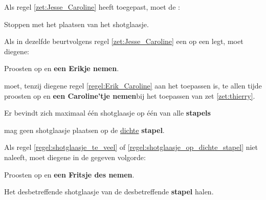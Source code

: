 \vervolgLijst{}
\item \label{zet:Jesse_Caroline_2} Als \eenSpeler regel \ref{zet:Jesse_Caroline} heeft toegepast, moet de \huidigeSpelerN:
\puntLijst{}
\item Stoppen met het plaatsen van het shotglaasje.
\eindPuntLijst{}
\eindLijst{}

\vervolgLijst{}
\item \label{regel:Erik_Caroline} Als \eenSpeler in dezelfde beurt\footnotemark[7] volgens regel \ref{zet:Jesse_Caroline} een \footnotemark[5] op een \footnotemark[6] legt, moet diegene:
\puntLijst{}
\item Proosten op  en \textbf{een Erikje nemen}\footnotemark[8].
\eindPuntLijst{}
\eindLijst{}

\vervolgLijst{}
\item \label{regel:Erik_Caroline_2} \EenSpeler moet, tenzij diegene regel \ref{regel:Erik_Caroline} aan het toepassen is, te allen tijde proosten op  en \textbf{een Caroline’tje nemen}\footnotemark[8] bij het toepassen van zet \ref{zet:thierry}\footnotemark[1].
\eindLijst{}


\vervolgLijst{}
\item \label{regel:caroline_een_shotglaasje} Er bevindt zich maximaal \'e\'en shotglaasje op \'e\'en van alle \textbf{stapels}
\label{regel:shotglaasje_te_veel}
\eindLijst{}

\vervolgLijst{}
\item \label{regel:caroline_onjuist_plaatsen_1} \EenSpeler mag geen shotglaasje plaatsen op de \ul{dichte} \textbf{stapel}.
\label{regel:shotglaasje_op_dichte_stapel}
\eindLijst{}


\vervolgLijst{}
\item Als \eenSpeler regel \ref{regel:shotglaasje_te_veel} of \ref{regel:shotglaasje_op_dichte_stapel} niet naleeft, moet diegene in de gegeven volgorde:
\puntLijst{}
\item Proosten op  en \textbf{een Fritsje des nemen}\footnotemark[4].
\item Het desbetreffende shotglaasje van de desbetreffende \textbf{stapel} halen.
\eindPuntLijst{}
\eindLijst{}



